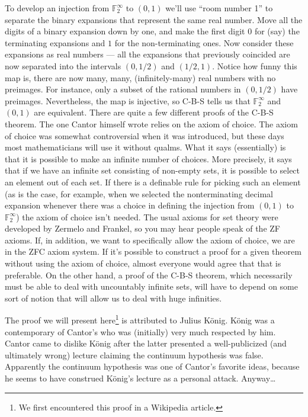 To develop an injection from ${\mathbb F}_2^\infty$ to $(0, 1)$ we'll use ``room number 1'' to
separate the binary expansions that represent the same real number.  Move
all the digits of a binary expansion down by one, and make the first digit
$0$ for (say) the terminating expansions and $1$ for the non-terminating ones.
Now consider these expansions as real numbers --- all the expansions that
previously coincided are now separated into the intervals $(0, 1/2)$ and 
$(1/2, 1)$.  Notice how funny this map is, there are now 
many, many, (infinitely-many) 
real numbers with no preimages.  For instance, only a subset of the rational
numbers in $(0, 1/2)$ have preimages. Nevertheless, the map is injective, so
C-B-S tells us that ${\mathbb F}_2^\infty$ and $(0, 1)$ are equivalent.
There are quite a few different proofs of the C-B-S theorem. The one
Cantor himself wrote relies on the axiom of choice.  The axiom of choice
was somewhat controversial when it was introduced, but these days most
mathematicians will use it without qualms.  What it says (essentially) is that
it is possible to make an infinite number of choices.  More precisely, it says
that if we have an infinite set consisting of non-empty sets, it is possible
to select an element out of each set.  If there is a definable rule for picking
such an element (as is the case, for example, when we selected the 
nonterminating decimal expansion whenever there was a choice in defining the
injection from $(0, 1)$ to ${\mathbb F}_2^\infty$) the axiom of choice 
isn't needed.   The usual
axioms for set theory were developed by Zermelo and Frankel, so you may
hear people speak of the ZF axioms.  If, in addition, we want to specifically
allow the axiom of choice, we are in the ZFC axiom system.  If it's possible
to construct a proof for a given theorem without using the axiom of choice,
almost everyone would agree that that is preferable.  On the other hand,
a proof of the C-B-S theorem, which necessarily must be able to deal with
uncountably infinite sets, will have to depend on some sort of notion that
will allow us to deal with huge infinities.

The proof we will present here\footnote{We first encountered this proof 
in a Wikipedia article\cite{wiki-CBS}.} is attributed to Julius K\"{o}nig.  
K\"{o}nig was a contemporary of Cantor's who was (initially) very 
much respected by him.  Cantor came to dislike K\"{o}nig after the 
latter presented a well-publicized (and ultimately wrong) lecture 
claiming the continuum hypothesis was false.
Apparently the continuum hypothesis was one of Cantor's favorite ideas,
because he seems to have construed K\"{o}nig's lecture as a personal attack.
Anyway\ldots 

